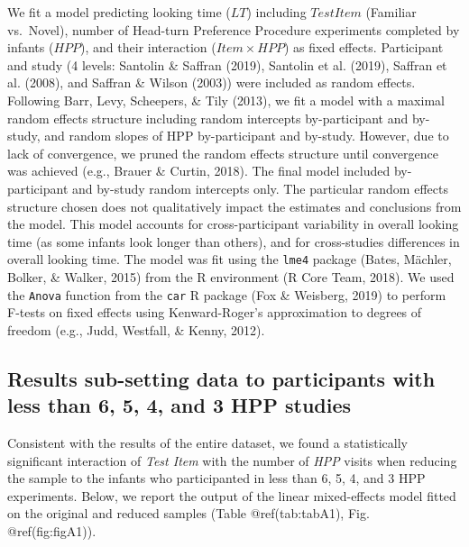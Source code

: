 \begin{appendix}
We fit a model predicting looking time (\(LT\)) including \(TestItem\)
(Familiar vs.~Novel), number of Head-turn Preference Procedure
experiments completed by infants (\(HPP\)), and their interaction
(\(Item \times HPP\)) as fixed effects. Participant and study (4 levels:
Santolin \& Saffran (2019), Santolin et al. (2019), Saffran et al.
(2008), and Saffran \& Wilson (2003)) were included as random effects.
Following Barr, Levy, Scheepers, \& Tily (2013), we fit a model with a
maximal random effects structure including random intercepts
by-participant and by-study, and random slopes of HPP by-participant and
by-study. However, due to lack of convergence, we pruned the random
effects structure until convergence was achieved (e.g., Brauer \&
Curtin, 2018). The final model included by-participant and by-study
random intercepts only. The particular random effects structure chosen
does not qualitatively impact the estimates and conclusions from the
model. This model accounts for cross-participant variability in overall
looking time (as some infants look longer than others), and for
cross-studies differences in overall looking time. The model was fit
using the \texttt{lme4} package (Bates, Mächler, Bolker, \& Walker,
2015) from the R environment (R Core Team, 2018). We used the
\texttt{Anova} function from the \texttt{car} R package (Fox \&
Weisberg, 2019) to perform F-tests on fixed effects using
Kenward-Roger's approximation to degrees of freedom (e.g., Judd,
Westfall, \& Kenny, 2012).

\hypertarget{results-sub-setting-data-to-participants-with-less-than-6-5-4-and-3-hpp-studies}{%
\subsection{Results sub-setting data to participants with less than 6,
5, 4, and 3 HPP
studies}\label{results-sub-setting-data-to-participants-with-less-than-6-5-4-and-3-hpp-studies}}

Consistent with the results of the entire dataset, we found a
statistically significant interaction of \emph{Test Item} with the
number of \emph{HPP} visits when reducing the sample to the infants who
participanted in less than 6, 5, 4, and 3 HPP experiments. Below, we
report the output of the linear mixed-effects model fitted on the
original and reduced samples (Table @ref(tab:tabA1), Fig.
@ref(fig:figA1)).


\end{appendix}
